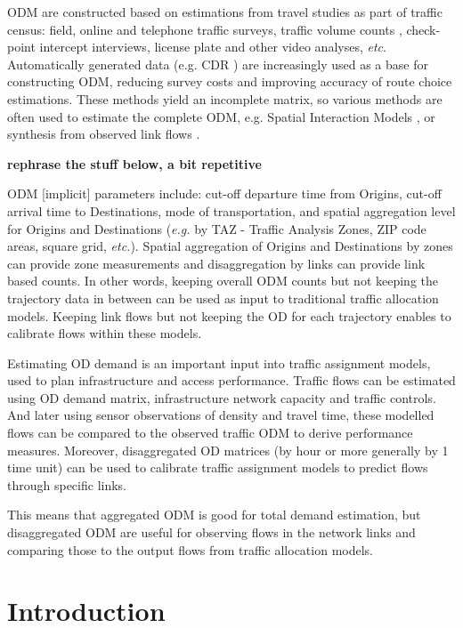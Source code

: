 \documentclass{llncs}
\begin{document}
ODM are constructed based on estimations from travel studies as part of traffic census: field, online and telephone traffic surveys, traffic volume counts \cite{robillard1975},  check-point intercept interviews, license plate and other video analyses, {\it etc}. Automatically generated data (e.g. CDR \cite{iqbal2014}) are increasingly used as a base for constructing ODM, reducing survey costs and improving accuracy of route choice estimations. These methods yield an incomplete matrix, so various methods are often used to estimate the complete ODM, e.g. Spatial Interaction Models \cite{WILSON1967}, or synthesis from observed link flows \cite{taylor2017}.




{\bf rephrase the stuff below, a bit repetitive}

ODM [implicit] parameters include: cut-off departure time from Origins, cut-off arrival time to Destinations, mode of transportation, and spatial aggregation level for Origins and Destinations ({\it e.g.} by TAZ - Traffic Analysis Zones, ZIP code areas, square grid, {\it etc.}). Spatial aggregation of Origins and Destinations by zones can provide zone measurements and disaggregation by links can provide link based counts. In other words, keeping overall ODM counts but not keeping the trajectory data in between can be used as input to traditional traffic allocation models. Keeping link flows but not keeping the OD for each trajectory enables to calibrate flows within these models.

Estimating OD demand is an important input into traffic assignment models, used to plan infrastructure and access performance. Traffic flows can be estimated using OD demand matrix, infrastructure network capacity and traffic controls. And later using sensor observations of density and travel time, these modelled flows can be compared to the observed traffic ODM to derive performance measures. Moreover, disaggregated OD matrices (by hour or more generally by 1 time unit) can be used to calibrate traffic assignment models to predict flows through specific links.


This means that aggregated ODM is good for total demand estimation, but disaggregated ODM are useful for observing flows in the network links and comparing those to the output flows from traffic allocation models.







\section{Introduction}
\end{document}
